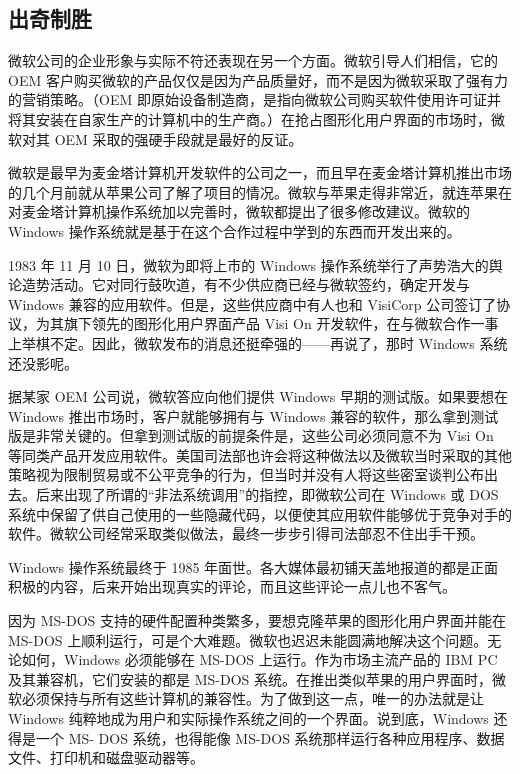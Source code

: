 \documentclass[12pt,UTF8]{ctexbook}
\begin{document}
\subsection{出奇制胜}


微软公司的企业形象与实际不符还表现在另一个方面。微软引导人们相信，它的 OEM 客户购买微软的产品仅仅是因为产品质量好，而不是因为微软采取了强有力的营销策略。（OEM 即原始设备制造商，是指向微软公司购买软件使用许可证并将其安装在自家生产的计算机中的生产商。）在抢占图形化用户界面的市场时，微软对其 OEM 采取的强硬手段就是最好的反证。

微软是最早为麦金塔计算机开发软件的公司之一，而且早在麦金塔计算机推出市场的几个月前就从苹果公司了解了项目的情况。微软与苹果走得非常近，就连苹果在对麦金塔计算机操作系统加以完善时，微软都提出了很多修改建议。微软的 Windows 操作系统就是基于在这个合作过程中学到的东西而开发出来的。

1983 年 11 月 10 日，微软为即将上市的 Windows 操作系统举行了声势浩大的舆论造势活动。它对同行鼓吹道，有不少供应商已经与微软签约，确定开发与 Windows 兼容的应用软件。但是，这些供应商中有人也和 VisiCorp 公司签订了协议，为其旗下领先的图形化用户界面产品 Visi On 开发软件，在与微软合作一事上举棋不定。因此，微软发布的消息还挺牵强的——再说了，那时 Windows 系统还没影呢。

据某家 OEM 公司说，微软答应向他们提供 Windows 早期的测试版。如果要想在 Windows 推出市场时，客户就能够拥有与 Windows 兼容的软件，那么拿到测试版是非常关键的。但拿到测试版的前提条件是，这些公司必须同意不为 Visi On 等同类产品开发应用软件。美国司法部也许会将这种做法以及微软当时采取的其他策略视为限制贸易或不公平竞争的行为，但当时并没有人将这些密室谈判公布出去。后来出现了所谓的“非法系统调用”的指控，即微软公司在 Windows 或 DOS 系统中保留了供自己使用的一些隐藏代码，以便使其应用软件能够优于竞争对手的软件。微软公司经常采取类似做法，最终一步步引得司法部忍不住出手干预。

Windows 操作系统最终于 1985 年面世。各大媒体最初铺天盖地报道的都是正面积极的内容，后来开始出现真实的评论，而且这些评论一点儿也不客气。

因为 MS-DOS 支持的硬件配置种类繁多，要想克隆苹果的图形化用户界面并能在 MS-DOS 上顺利运行，可是个大难题。微软也迟迟未能圆满地解决这个问题。无论如何，Windows 必须能够在 MS-DOS 上运行。作为市场主流产品的 IBM PC 及其兼容机，它们安装的都是 MS-DOS 系统。在推出类似苹果的用户界面时，微软必须保持与所有这些计算机的兼容性。为了做到这一点，唯一的办法就是让 Windows 纯粹地成为用户和实际操作系统之间的一个界面。说到底，Windows 还得是一个 MS- DOS 系统，也得能像 MS-DOS 系统那样运行各种应用程序、数据文件、打印机和磁盘驱动器等。
\end{document}
